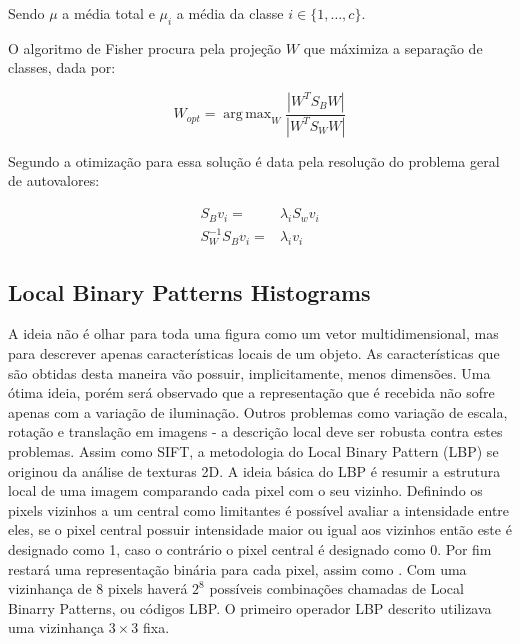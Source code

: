 Sendo $\mu$ a média total e $\mu_i$ a média da classe $i \in \{1,\ldots,c\}$.

O algoritmo de Fisher procura pela projeção $W$ que máximiza a separação de classes, dada por:

\begin{equation*}
W_{opt} = \operatorname{arg\,max}_{W} \frac{|W^T S_B W|}{|W^T S_W W|}
\end{equation*}

Segundo \cite{fisherfaces} a otimização para essa solução é data pela resolução do problema geral de autovalores:



\begin{align*} 
    S_{B} v_{i} = & \lambda_{i} S_w v_{i} \nonumber \\ 
    S_{W}^{-1} S_{B} v_{i} = & \lambda_{i} v_{i} 
\end{align*}


\subsection*{Local Binary Patterns Histograms} %
\label{sub:local_binary_patterns_histograms}

A ideia não é olhar para toda uma figura como um vetor multidimensional, mas para descrever apenas características locais de um objeto. As características que são obtidas desta maneira vão possuir, implicitamente, menos dimensões. Uma ótima ideia,  porém será observado que a representação que é recebida não sofre apenas com a variação de iluminação. Outros problemas como variação de escala, rotação e translação em imagens - a descrição local deve ser robusta contra estes problemas. Assim como {\ttfamily SIFT}, a metodologia do Local Binary Pattern (LBP) se originou da análise de texturas 2D. A ideia básica do LBP é resumir a estrutura local de uma imagem comparando cada pixel com o seu vizinho. Definindo os pixels vizinhos a um central como limitantes é possível avaliar a intensidade entre eles, se o pixel central possuir intensidade maior ou igual aos vizinhos então este é designado como 1, caso o contrário o pixel central é designado como 0. Por fim restará uma representação binária para cada pixel, assim como {}. Com uma vizinhança de 8 pixels haverá $2^8$ possíveis combinações chamadas de Local Binarry Patterns, ou códigos LBP. O primeiro operador LBP descrito utilizava uma vizinhança $3 \times 3$ fixa.

